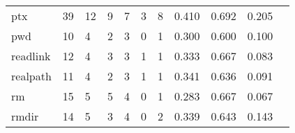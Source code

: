 \begin{longtable}{lp{1.2cm}p{1.2cm}p{1.2cm}p{1.2cm}p{1.2cm}p{1.2cm}p{1.2cm}p{1.2cm}p{1.2cm}p{1.2cm}}
ptx       &                                    39 &                                                 12 &                                                  9 &                                                  7 &                                                  3 &                                                  8 &                                         0.410 &                                              0.692 &                                              0.205 \\
pwd       &                                    10 &                                                  4 &                                                  2 &                                                  3 &                                                  0 &                                                  1 &                                         0.300 &                                              0.600 &                                              0.100 \\
readlink  &                                    12 &                                                  4 &                                                  3 &                                                  3 &                                                  1 &                                                  1 &                                         0.333 &                                              0.667 &                                              0.083 \\
realpath  &                                    11 &                                                  4 &                                                  2 &                                                  3 &                                                  1 &                                                  1 &                                         0.341 &                                              0.636 &                                              0.091 \\
rm        &                                    15 &                                                  5 &                                                  5 &                                                  4 &                                                  0 &                                                  1 &                                         0.283 &                                              0.667 &                                              0.067 \\
rmdir     &                                    14 &                                                  5 &                                                  3 &                                                  4 &                                                  0 &                                                  2 &                                         0.339 &                                              0.643 &                                              0.143 \\

\end{longtable}
